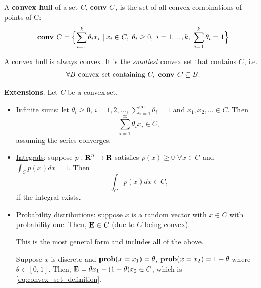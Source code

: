 \begin{Definition}
  A \textbf{convex hull} of a set $C$, $\conv{C}$, is the set of all convex
  combinations of points of C:
  \begin{equation*}
    \conv{C} = \Bigl\{
    \sum_{i=1}^k\theta_ix_i \mid x_i\in C,\,\,\theta_i\ge 0,\,\,
    i=1,...,k,\,\,\sum_{i=1}^k\theta_i = 1
    \Bigr\}
  \end{equation*}
\end{Definition}

\begin{Fact}
  A convex hull is always convex. It is the \textit{smallest} convex set that
  contains $C$, i.e.\
  \begin{eqnarray*}
    \forall B\text{ convex set containing }C,\,\,\conv{C}\subseteq B.
  \end{eqnarray*}
\end{Fact}

\begin{Fact}
  \textbf{Extensions}. Let $C$ be a convex set.
  \begin{itemize}
  \item \underline{Infinite sums}: let $\theta_i\ge 0$, $i=1,2,...$,
    $\sum_{i=1}^\infty \theta_i = 1$ and $x_1,x_2,...\in C$. Then
    \begin{equation}
      \label{eq:convex_combination_infinite_sum}
      \sum_{i=1}^\infty \theta_ix_i\in C,
    \end{equation}
    assuming the series converges.
  \item \underline{Integrals}: suppose $p:\Reals^n\to\Reals$ satisfies
    $p(x)\ge 0$ $\forall x\in C$ and $\int_Cp(x)dx=1$. Then
    \begin{equation}
      \label{eq:convex_combination_integral}
      \int_C p(x)dx\in C,
    \end{equation}
    if the integral exists.
  \item \underline{Probability distributions}: suppose $x$ is a random vector
    with $x\in C$ with probability one. Then, $\Expectation x\in C$ (due to $C$
    being convex).

    \begin{Fact}
      {\color{red} This is the most general form and includes all of the above}.
    \end{Fact}

    \begin{Example}
      Suppose $x$ is discrete and $\Prob(x=x_1)=\theta$, $\Prob(x=x_2)=1-\theta$
      where $\theta\in[0,1]$. Then, $\Expectation x=\theta x_1+(1-\theta)x_2\in
      C$, which is \eqref{eq:convex_set_definition}.
    \end{Example}
  \end{itemize}
\end{Fact}

